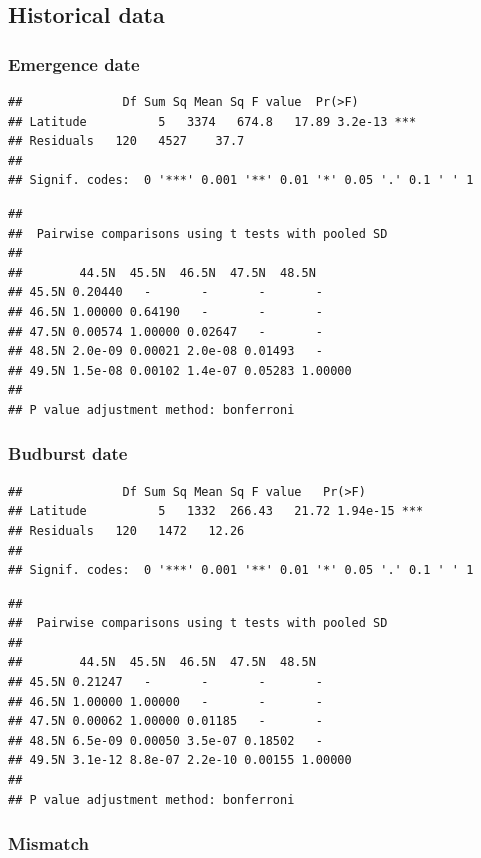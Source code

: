 \documentclass[12 pt]{article}
\begin{document}
\subsection{Historical data}
\subsubsection*{Emergence date}

\begin{verbatim}
##              Df Sum Sq Mean Sq F value  Pr(>F)    
## Latitude          5   3374   674.8   17.89 3.2e-13 ***
## Residuals   120   4527    37.7                    
## 
## Signif. codes:  0 '***' 0.001 '**' 0.01 '*' 0.05 '.' 0.1 ' ' 1
\end{verbatim}

\begin{verbatim}
## 
##  Pairwise comparisons using t tests with pooled SD 
## 
##        44.5N  45.5N  46.5N  47.5N  48.5N
## 45.5N 0.20440   -       -       -       -      
## 46.5N 1.00000 0.64190   -       -       -      
## 47.5N 0.00574 1.00000 0.02647   -       -      
## 48.5N 2.0e-09 0.00021 2.0e-08 0.01493   -      
## 49.5N 1.5e-08 0.00102 1.4e-07 0.05283 1.00000
## 
## P value adjustment method: bonferroni
\end{verbatim}

\subsubsection*{Budburst date}

\begin{verbatim}
##              Df Sum Sq Mean Sq F value   Pr(>F)    
## Latitude          5   1332  266.43   21.72 1.94e-15 ***
## Residuals   120   1472   12.26                     
## 
## Signif. codes:  0 '***' 0.001 '**' 0.01 '*' 0.05 '.' 0.1 ' ' 1
\end{verbatim}

\begin{verbatim}
## 
##  Pairwise comparisons using t tests with pooled SD 
##  
##        44.5N  45.5N  46.5N  47.5N  48.5N 
## 45.5N 0.21247   -       -       -       -      
## 46.5N 1.00000 1.00000   -       -       -      
## 47.5N 0.00062 1.00000 0.01185   -       -      
## 48.5N 6.5e-09 0.00050 3.5e-07 0.18502   -      
## 49.5N 3.1e-12 8.8e-07 2.2e-10 0.00155 1.00000
## 
## P value adjustment method: bonferroni
\end{verbatim}

\subsubsection*{Mismatch}
\end{document}
